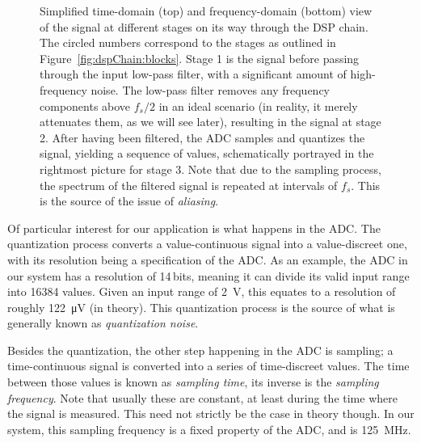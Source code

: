 \begin{figure}
    \centering
    
    
    \caption[Signals Passing Through the DSP Chain (Simplified)]{%
        Simplified  time-domain  (top)   and  frequency-domain  (bottom)  view
        of  the  signal  at  different  stages on  its  way  through  the  DSP
        chain. The  circled  numbers  correspond  to the  stages  as  outlined
        in  Figure~\ref{fig:dspChain:blocks}.  Stage  1 is  the signal  before
        passing through the  input low-pass filter, with  a significant amount
        of  high-frequency noise. The  low-pass filter  removes any  frequency
        components  above ${f_s}/{2}$  in an  ideal scenario  (in reality,  it
        merely attenuates them, as we will see later), resulting in the signal
        at  stage  2.\protect\newline
        After  having  been  filtered,  the  ADC  samples  and  quantizes  the
        signal, yielding a sequence of  values, schematically portrayed in the
        rightmost picture for stage 3.  Note that due to the sampling process,
        the  spectrum of  the  filtered  signal is  repeated  at intervals  of
        $f_s$. This is the source of the issue of \emph{aliasing}.%
    }
    \label{fig:dspChain:signals}
\end{figure}

Of particular  interest for our  application is  what happens in  the ADC. The
quantization process converts a  value-continuous signal into a value-discreet
one, with  its resolution  being a  specification of  the ADC. As  an example,
the  ADC  in  our  system  has a  resolution  of  \num{14}\,bits,  meaning  it
can  divide its  valid input  range  into \num{16384}  values. Given an  input
range of  \SI{2}{\volt_}, this equates  to a resolution  of roughly
\SI{122}{\micro\volt} (in theory). This quantization  process is the source of
what is generally known as \emph{quantization noise}.

Besides the quantization,  the other step happening in the  ADC is sampling; a
time-continuous signal is converted into a series of time-discreet values. The
time between those values is known as \emph{sampling time}, its inverse is the
\emph{sampling  frequency}. Note that  usually  these are  constant, at  least
during the  time where the signal  is measured. This need not  strictly be the
case  in theory  though. In our  system, this  sampling frequency  is a  fixed
property of the ADC, and is \SI{125}{\mega\hertz}.

